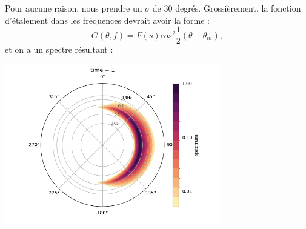 \documentclass[10pt]{article}
\numberwithin{equation}{section}
\begin{document}
Pour aucune raison, nous prendre un \(\sigma\) de 30 degrés. Grossièrement, la fonction d'étalement dans les fréquences devrait avoir la forme : 
\begin{equation}
   G(\theta,f)=F(s)cos^{2}\frac{1}{2}(\theta-\theta_{m}),
\end{equation}
et on a un spectre résultant  :

\begin{center}
\includegraphics[width=0.7\textwidth]{Figures/figures/jonswap-wavespectra2.png}
\end{center}
\end{document}
